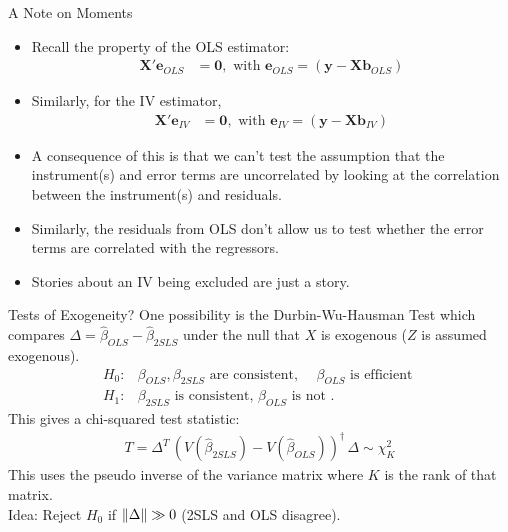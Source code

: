 \documentclass[aspectratio=169,11pt]{beamer}
\begin{document}
\begin{frame}{A Note on Moments}
\begin{itemize}
	\item Recall the property of the OLS estimator:
\begin{align*}
	\mathbf{X}'\mathbf{e}_{OLS}&=\mathbf{0}, \text{ with }
	\mathbf{e}_{OLS}=\left(\mathbf{y}-\mathbf{X}\mathbf{b}_{OLS}\right)
\end{align*}
	\item Similarly, for the IV estimator,
\begin{align*}
	\mathbf{X}'\mathbf{e}_{IV}&=\mathbf{0}, \text{ with }
	\mathbf{e}_{IV}=\left(\mathbf{y}-\mathbf{X}\mathbf{b}_{IV}\right)
\end{align*}
\item A consequence of this is that we can't
	test the assumption that the instrument(s) and
	error terms are uncorrelated by looking at the
	correlation between the instrument(s) and residuals.

	\smallskip
	\item Similarly, the residuals from OLS don't allow
	us to test whether the error terms are correlated with the
	regressors.
	\item Stories about an IV being \alert{excluded} are \alert{just a story}.
\end{itemize}
\end{frame}



\begin{frame}{Tests of Exogeneity?}
One possibility is the \alert{Durbin-Wu-Hausman Test} which compares $\Delta = \widehat{\beta}_{OLS} - \widehat{\beta}_{2SLS}$ under the null that $X$ is \alert{exogenous} ($Z$ is assumed exogenous).
\begin{align*}
H_0: & \beta_{OLS}, \beta_{2SLS} \text{ are consistent, }\quad \beta_{OLS} \text{ is efficient }\\
H_1: & \beta_{2SLS} \text{ is consistent, } \beta_{OLS} \text{ is not }.
\end{align*}
This gives a chi-squared test statistic:
\begin{align*}
T = \Delta^T\, (V(\widehat{\beta}_{2SLS}) - V(\widehat{\beta}_{OLS}))^{\dagger}\, \Delta \sim \chi^2_{K}
\end{align*}
This uses the \alert{pseudo inverse} of the variance matrix where $K$ is the rank of that matrix.\\
\medskip
Idea: Reject $H_0$ if $\lVert\Delta\rVert \gg 0$ (2SLS and OLS disagree).
\end{frame}
\end{document}
